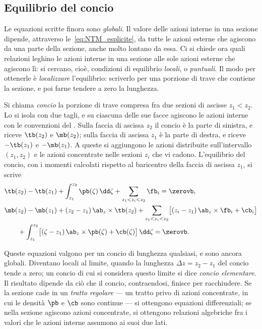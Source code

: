 \subsection{Equilibrio del concio}
\label{sec:equilibrio_concio}

Le equazioni scritte finora sono \emph{globali}. Il
valore delle azioni interne in una sezione dipende,
attraverso le~\eqref{eq:NTM_esplicite}, da tutte le azioni
esterne che agiscono da una parte della sezione, anche
molto lontano da essa. Ci si chiede ora quali relazioni
leghino le azioni interne in una sezione alle sole azioni
esterne che agiscono lì: si cercano, cioè, condizioni di
equilibrio \emph{locali}, o \emph{puntuali}. Il modo per
ottenerle è \emph{localizzare} l'equilibrio: scriverlo
per una porzione di trave che contiene la sezione, e poi
farne tendere a zero la lunghezza.

Si chiama \emph{concio} la porzione
di trave compresa fra due sezioni di ascisse $z_1 < z_2$.
Lo si isola con due tagli, e su ciascuna delle sue facce
agiscono le azioni interne con le convenzioni del
. Sulla faccia di ascissa $z_2$
il concio è la parte di sinistra, e riceve $\tb(z_2)$ e
$\mb(z_2)$; sulla faccia di ascissa $z_1$ è la parte di
destra, e riceve $-\tb(z_1)$ e $-\mb(z_1)$. A queste si
aggiungono le azioni distribuite sull'intervallo
$(z_1, z_2)$ e le azioni concentrate nelle sezioni $z_i$
che vi cadono. L'equilibrio del concio, con i momenti
calcolati rispetto al baricentro della faccia di ascissa
$z_1$, si scrive
\begin{equation}\label{eq:eq_concio}
	\begin{aligned}
		&\tb(z_2) - \tb(z_1) + \int_{z_1}^{z_2} \pb(\zeta)\,\dd\zeta
		+ \sum_{z_1 < z_i < z_2} \fb_i = \zerovb,\\
		&\mb(z_2) - \mb(z_1) + (z_2 - z_1)\,\ab_z \times \tb(z_2)
		+ \sum_{z_1 < z_i < z_2} \bigl[(z_i - z_1)\,\ab_z \times \fb_i + \cb_i\bigr]\\
		&\qquad + \int_{z_1}^{z_2} \bigl[(\zeta - z_1)\,\ab_z \times \pb(\zeta) + \cb(\zeta)\bigr]\,\dd\zeta
		= \zerovb.
	\end{aligned}
\end{equation}

Queste equazioni valgono per un concio di lunghezza
qualsiasi, e sono ancora globali. Diventano locali al
limite, quando la lunghezza $\Delta z = z_2 - z_1$ del
concio tende a zero; un concio di cui si considera questo
limite si dice \emph{concio elementare}.
Il risultato dipende da ciò che il concio, contraendosi,
finisce per racchiudere. Se la sezione cade in un
\emph{tratto regolare} ---
un tratto privo di azioni concentrate, in cui le densità
$\pb$ e $\cb$ sono continue --- si ottengono equazioni
differenziali; se nella sezione agiscono azioni
concentrate, si ottengono relazioni algebriche fra i
valori che le azioni interne assumono ai suoi due lati.



